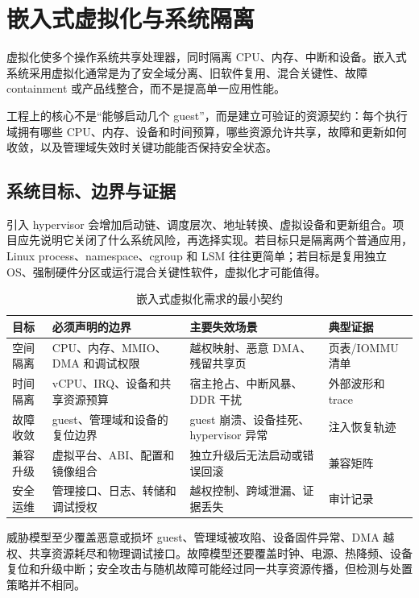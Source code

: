 \chapter{嵌入式虚拟化与系统隔离}
\label{chap:virtualization-isolation}

虚拟化使多个操作系统共享处理器，同时隔离 CPU、内存、中断和设备。嵌入式系统采用虚拟化通常是为了安全域分离、旧软件复用、混合关键性、故障 containment 或产品线整合，而不是提高单一应用性能。

工程上的核心不是“能够启动几个 guest”，而是建立可验证的资源契约：每个执行域拥有哪些 CPU、内存、设备和时间预算，哪些资源允许共享，故障和更新如何收敛，以及管理域失效时关键功能能否保持安全状态。

\section{系统目标、边界与证据}

引入 hypervisor 会增加启动链、调度层次、地址转换、虚拟设备和更新组合。项目应先说明它关闭了什么系统风险，再选择实现。若目标只是隔离两个普通应用，Linux process、namespace、cgroup 和 LSM 往往更简单；若目标是复用独立 OS、强制硬件分区或运行混合关键性软件，虚拟化才可能值得。

\begin{table}[H]
  \centering
  \caption{嵌入式虚拟化需求的最小契约}
  \begin{tabular}{p{26mm}p{38mm}p{39mm}p{33mm}}
    \hline
    目标 & 必须声明的边界 & 主要失效场景 & 典型证据 \\
    \hline
    空间隔离 & CPU、内存、MMIO、DMA 和调试权限 & 越权映射、恶意 DMA、残留共享页 & 页表/IOMMU 清单 \\
    时间隔离 & vCPU、IRQ、设备和共享资源预算 & 宿主抢占、中断风暴、DDR 干扰 & 外部波形和 trace \\
    故障收敛 & guest、管理域和设备的复位边界 & guest 崩溃、设备挂死、hypervisor 异常 & 注入恢复轨迹 \\
    兼容升级 & 虚拟平台、ABI、配置和镜像组合 & 独立升级后无法启动或错误回滚 & 兼容矩阵 \\
    安全运维 & 管理接口、日志、转储和调试授权 & 越权控制、跨域泄漏、证据丢失 & 审计记录 \\
    \hline
  \end{tabular}
\end{table}

威胁模型至少覆盖恶意或损坏 guest、管理域被攻陷、设备固件异常、DMA 越权、共享资源耗尽和物理调试接口。故障模型还要覆盖时钟、电源、热降频、设备复位和升级中断；安全攻击与随机故障可能经过同一共享资源传播，但检测与处置策略并不相同。

